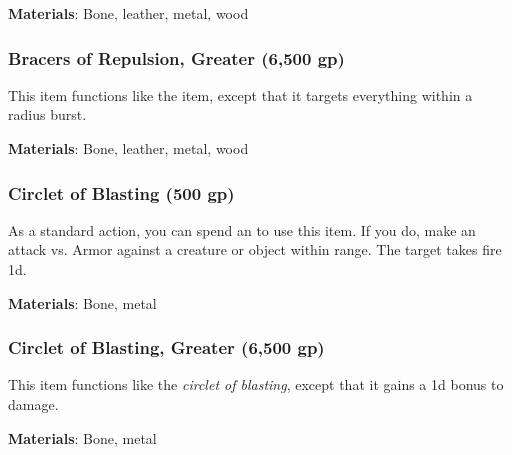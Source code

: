 \vspace{0.25em}
\textbf{Materials}: Bone, leather, metal, wood


\lowercase{\hypertarget{item:Bracers of Repulsion, Greater}{}}\label{item:Bracers of Repulsion, Greater}
\hypertarget{item:Bracers of Repulsion, Greater}{\subsubsection{Bracers of Repulsion, Greater\hfill{} (6,500 gp)}}

This item functions like the  item, except that it targets everything within a \arealarge radius burst.



\vspace{0.25em}
\textbf{Materials}: Bone, leather, metal, wood


\lowercase{\hypertarget{item:Circlet of Blasting}{}}\label{item:Circlet of Blasting}
\hypertarget{item:Circlet of Blasting}{\subsubsection{Circlet of Blasting\hfill{} (500 gp)}}

As a standard action, you can spend an  to use this item.
If you do, make an attack vs. Armor against a creature or object within \rngmed range.
\hit The target takes fire  \plus1d.



\vspace{0.25em}
\textbf{Materials}: Bone, metal


\lowercase{\hypertarget{item:Circlet of Blasting, Greater}{}}\label{item:Circlet of Blasting, Greater}
\hypertarget{item:Circlet of Blasting, Greater}{\subsubsection{Circlet of Blasting, Greater\hfill{} (6,500 gp)}}

This item functions like the \textit{circlet of blasting}, except that it gains a \plus1d bonus to damage.



\vspace{0.25em}
\textbf{Materials}: Bone, metal


